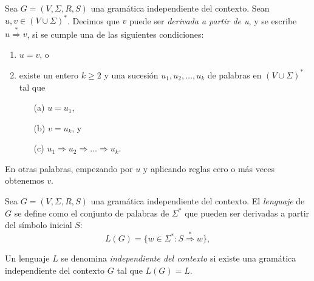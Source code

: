 \documentclass[twoside]{article}
\begin{document}
\newpage

\begin{defi}
Sea $G=(V,\Sigma,R,S)$ una gramática independiente del contexto. Sean $u,v\in(V\cup\Sigma)^*$. Decimos que $v$ puede ser \emph{derivada a partir de u}, y se escribe $u\overset{*}{\Rightarrow} v$, si se cumple una de las siguientes condiciones:
\begin{enumerate}
\item $u=v$, o
\item existe un entero $k\geq 2$ y una sucesión $u_1,u_2,\dots, u_k$ de palabras en $(V\cup\Sigma)^*$ tal que
\begin{itemize}
\item[(a)] $u=u_1$,
\item[(b)] $v=u_k$, y
\item[(c)] $u_1\Rightarrow u_2\Rightarrow\dots\Rightarrow u_k$.
\end{itemize}
\end{enumerate} 
En otras palabras, empezando por $u$ y aplicando reglas cero o más veces obtenemos $v$. 
\end{defi}

\begin{defi}
Sea $G=(V,\Sigma,R,S)$ una gramática independiente del contexto. El \emph{lenguaje} de $G$ se define como el conjunto de palabras de $\Sigma^*$ que pueden ser derivadas a partir del símbolo inicial $S$:
$$L(G)=\{w\in\Sigma^*: S\overset{*}{\Rightarrow} w\},$$
\end{defi}

\begin{defi}
Un lenguaje $L$ se denomina \emph{independiente del contexto} si existe una gramática independiente del contexto $G$ tal que $L(G)=L$. 
\end{defi}
\end{document}
